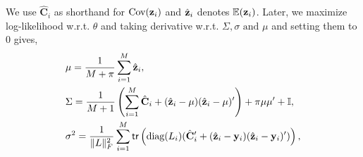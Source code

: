 \begin{comment}
\textbf{E step}: We calculate the expected log-likelihood as, 
$$Q(\theta) = \E_{\{\z_i\}^M | \{ \phi(\y_i) \}^M, \mu, \Sigma }( -\log (f ( \{ \phi(y_i )  \}^M, \{\z_i\}^M  \vert \theta)f(\mu,\Sigma)  ), $$ 

The log of the likelihood function is given by,
\begin{equation}
\begin{aligned}
&\textit{L} \left(\theta \vert \{ \phi(y_i ) \}^M, \{ \z_i\}^M \right) 
= \log(f \left( \{ \phi(y_i ) \}^M, \{ \z_i\}^M \vert \theta \right)),\\
&=   -\frac{1}{2} \mathlarger{ \sum}_{i = 1}^M [   \z_i' \left( \frac{\diag(L_i)}{\sigma^2} + \Sigma^{-1} \right) \z_i   - 2\left( \frac{y_i' \diag(L_i)}{\sigma^2}+\mu' \Sigma^{-1}  \right)\z_i  \\ 
&+ \frac{y_i' \diag(L_i) y_i}{\sigma^2}  + \mu'\Sigma^{-1}\mu  ]  - \log \left((\sqrt{2\pi\sigma})^{\| L\|_F^2} (2\pi \det(\Sigma))^\frac{M}{2}\right),\\
 \end{aligned}
 \label{eq:likelihood}
\end{equation}
Thus after some algebraic manipulation we have,
\begin{equation}
\begin{aligned}
\label{eq:estep}
Q(\theta) & = \text{Const} +  \mathlarger{ \sum}_{i = 1}^M   [ \tr \left( \left( \frac{\diag(L_i)}{\sigma^2} + \Sigma^{-1} \right) (\hat{\mathbf{C}}_i + \hat{\z}_i  \hat{\z}_i') \right) \\
&-2\left( \frac{\y_i' \diag(L_i)}{\sigma^2} +\mu' \Sigma^{-1}  \right)\hat{\z}_i   + \frac{\y_i' \diag(L_i) \y_i}{\sigma^2}  \\
&+ \mu'\Sigma^{-1}\mu  + \frac{ \| L\|_F^2}{M} \log(\sigma^2) + \log(\det(\Sigma)) ] \\ &+\log(\det(\Sigma))+\pi\mu'\Sigma^{-1}\mu+\tr(\Sigma^{-1}) ,
 \end{aligned}
\end{equation}
\end{comment}

We use $\hat{\mathbf{C}}_i$ as shorthand for  $\text{Cov}(\mathbf{z}_i)$ and $\hat{\mathbf{z}}_i$ denotes  $\mathbb{E}(\mathbf{z}_i)$. Later, we maximize log-likelihood w.r.t. $\theta$ and 
taking derivative w.r.t. $\Sigma,\sigma \text{ and }\mu$ and setting them to 0 gives,
\begin{equation}
\label{eq:maximization}
\begin{aligned}
&\mu = \frac{1}{M +\pi} \sum_{i = 1}^M \hat{\mathbf{z}}_i,  \\
&  \Sigma = \frac{1}{M+1} \left(\sum_{i = 1}^{M}\hat{\mathbf{C}}_i + (\hat{\mathbf{z}}_i -\mu)(\hat{\mathbf{z}}_i -\mu)'\right) +\pi\mu\mu' +\mathbb{I},\\
& \sigma^2 = \frac{1}{\|L\|_F^2} \sum_{i = 1}^{M}  {\sf tr}\left(\text{diag}(L_i)(\hat{\mathbf{C}}_i' + (\hat{\mathbf{z}}_i - \mathbf{y}_i)(\hat{\mathbf{z}}_i - \mathbf{y}_i)' )\right),\\
 \end{aligned}
\end{equation}

